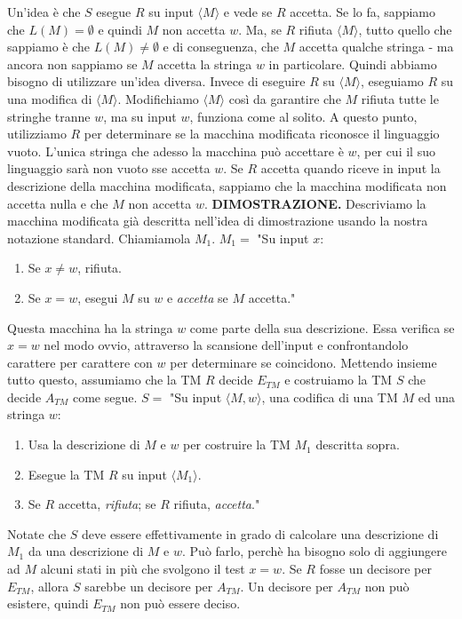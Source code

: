 \documentclass{article}
\begin{document}
Un'idea è che $S$ esegue $R$ su input $\langle M \rangle$ e vede se $R$ accetta.
Se lo fa, sappiamo che $L(M) = \emptyset$ e quindi $M$ non accetta $w$.
Ma, se $R$ rifiuta $\langle M \rangle$, tutto quello che sappiamo è che $L(M) \neq \emptyset$ e di conseguenza, che $M$ accetta qualche stringa - ma ancora non sappiamo se $M$ accetta la stringa $w$ in particolare.
Quindi abbiamo bisogno di utilizzare un'idea diversa.
Invece di eseguire $R$ su $\langle M \rangle$, eseguiamo $R$ su una modifica di $\langle M \rangle$.
Modifichiamo $\langle M \rangle$ così da garantire che $M$ rifiuta tutte le stringhe tranne $w$, ma su input $w$, funziona come al solito.
A questo punto, utilizziamo $R$ per determinare se la macchina modificata riconosce il linguaggio vuoto.
L'unica stringa che adesso la macchina può accettare è $w$, per cui il suo linguaggio sarà non vuoto sse accetta $w$.
Se $R$ accetta quando riceve in input la descrizione della macchina modificata, sappiamo che la macchina modificata non accetta nulla e che $M$ non accetta $w$.
\vspace{1em}
\text{}
\newline
\hbox{\textbf{DIMOSTRAZIONE.}}
Descriviamo la macchina modificata già descritta nell'idea di dimostrazione usando la nostra notazione standard.
Chiamiamola $M_1$.
\vspace{1em}
\text{}
\newline
$M_1 =$ "Su input $x$:
\begin{enumerate}
    \item Se $x \neq w$, rifiuta.
    \item Se $x = w$, esegui $M$ su $w$ e \textit{accetta} se $M$ accetta."
\end{enumerate}
\vspace{1em}
\text{}
\newline
Questa macchina ha la stringa $w$ come parte della sua descrizione.
Essa verifica se $x = w$ nel modo ovvio, attraverso la scansione dell'input e confrontandolo carattere per carattere con $w$ per determinare se coincidono.
Mettendo insieme tutto questo, assumiamo che la TM $R$ decide $E_{TM}$ e costruiamo la TM $S$ che decide $A_{TM}$ come segue.
\vspace{1em}
\text{}
\newline
$S = $ "Su input $\langle M,w \rangle$, una codifica di una TM $M$ ed una stringa $w$:
\begin{enumerate}
    \item Usa la descrizione di $M$ e $w$ per costruire la TM $M_1$ descritta sopra.
    \item Esegue la TM $R$ su input $\langle M_1 \rangle$.
    \item Se $R$ accetta, \textit{rifiuta}; se $R$ rifiuta, \textit{accetta}."
\end{enumerate}
Notate che $S$ deve essere effettivamente in grado di calcolare una descrizione di $M_1$ da una descrizione di $M$ e $w$.
Può farlo, perchè ha bisogno solo di aggiungere ad $M$ alcuni stati in più che svolgono il test $x = w$.
Se $R$ fosse un decisore per $E_{TM}$, allora $S$ sarebbe un decisore per $A_{TM}$.
Un decisore per $A_{TM}$ non può esistere, quindi $E_{TM}$ non può essere deciso.
\end{document}
